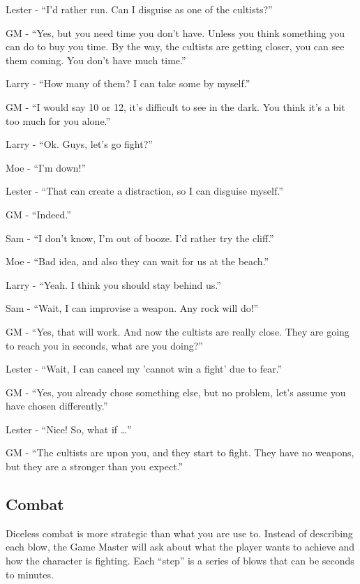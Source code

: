 \documentclass[11pt]{article}
\begin{document}
Lester - \enquote{I'd rather run. Can I disguise as one of the cultists?}

GM - \enquote{Yes, but you need time you don't have. Unless you think something you can do to buy you time. By the way, the cultists are getting closer, you can see them coming. You don't have much time.}

Larry - \enquote{How many of them? I can take some by myself.}

GM - \enquote{I would say 10 or 12, it's difficult to see in the dark. You think it's a bit too much for you alone.}

Larry - \enquote{Ok. Guys, let's go fight?}

Moe - \enquote{I'm down!}

Lester - \enquote{That can create a distraction, so I can disguise myself.}

GM - \enquote{Indeed.}

Sam - \enquote{I don't know, I'm out of booze. I'd rather try the cliff.}

Moe - \enquote{Bad idea, and also they can wait for us at the beach.}

Larry - \enquote{Yeah. I think you should stay behind us.}

Sam - \enquote{Wait, I can improvise a weapon. Any rock will do!}

GM - \enquote{Yes, that will work. And now the cultists are really close. They are going to reach you in seconds, what are you doing?}

Lester - \enquote{Wait, I can cancel my 'cannot win a fight' due to fear.}

GM - \enquote{Yes, you already chose something else, but no problem, let's assume you have chosen differently.}

Lester - \enquote{Nice! So, what if \ldots{}}

GM - \enquote{The cultists are upon you, and they start to fight. They have no weapons, but they are a stronger than you expect.}

\subsection{Combat}
\label{sec:orge74e7bb}
Diceless combat is more strategic than what you are use to. Instead of describing each blow, the Game Master will ask about what the player wants to achieve and how the character is fighting. Each \enquote{step} is a series of blows that can be seconds to minutes.
\end{document}
